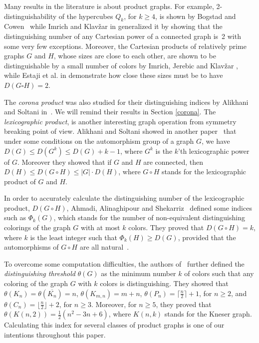 \documentclass[12pt,a4paper, longbibliography]{article}
\theoremstyle{definition}
\numberwithin{equation}{section}
\begin{document}
	
	Many results in the literature is about product graphs. For example, 2-distinguishability of the hypercubes $Q_k$, for $k\geq 4$, is shown by Bogstad and Cowen~\cite{Bogstad2004} while Imrich and Klav{\v{z}}ar in \cite{Imrich2006CartPower} generalized it by showing that the distinguishing number of any Cartesian power of a connected graph is~2 with some very few exceptions. Moreover, the Cartesian products of relatively prime graphs $G$ and $H$, whose sizes are close to each other, are shown to be distinguishable by a small number of colors by Imrich, Jerebic and Klav\v{z}ar \cite{Imrich2008CartComp},  while Estaji et al. in \cite{Estaji} demonstrate how close these sizes must be to have $D(G\square H)=2$.
	
	The  \emph{corona product} was also studied for their distinguishing indices by Alikhani and Soltani in~\cite{Alikhani2017corona}.
	We will remind their results in Section \ref{corona}. The \emph{lexicographic product}, is another interesting graph operation from symmetry breaking point of view. Alikhani and Soltani showed in another paper~\cite{Alikhani2018} that under some conditions on the automorphism group of a graph $G$, we have $D(G)\leq D(G^k)\leq D(G)+k-1$, where $G^k$ is the $k$'th lexicographic power of $G$. Moreover they showed that if $G$ and $H$ are connected, then  $D(H)\leq D(G\circ H)\leq |G|\cdot D(H)$, where $G\circ H$ stands for the lexicographic product of $G$ and $H$.
	
	In order to accurately calculate the distinguishing number of the lexicographic product, $D(G\circ H)$, Ahmadi, Alinaghipour and Shekarriz~\cite{ahmadi2020number} defined some indices such as $\Phi_k(G)$, which stands for the number of non-equivalent distinguishing colorings of the graph $G$ with at most $k$ colors. They proved that $D(G\circ H)=k$, where $k$ is the least integer such that $\Phi_k (H)\geq D(G)$, provided that  the automorphisms of $G\circ H$ are all natural~\cite{heminger1968}.
	
	To overcome some computation difficulties, the authors of~\cite{ahmadi2020number} further defined the \textit{distinguishing threshold} $\theta(G)$ as the minimum number $k$ of colors such that any coloring of the graph $G$ with $k$ colors is distinguishing. They showed that $\theta(K_n)=\theta(\overline{K_n})=n$, 
 $\theta(K_{m,n})=m+n$, $\theta(P_n)=\lceil\frac{n}{2}\rceil+1$, for $n\geq 2$, and $\theta(C_n)=\lfloor\frac{n}{2}\rfloor+2$, for $n\geq 3$. Moreover, for $n\geq 5$, they proved that $\theta(K(n,2))=\frac{1}{2}(n^2-3n+6)$, where $K(n,k)$ stands for the Kneser graph.  Calculating this index for several classes of product graphs is one of our intentions throughout this paper.
	
\end{document}
